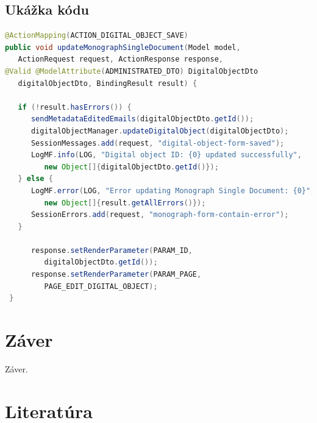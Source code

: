 \documentclass[
  print, %
  table,   %
  lof,     %
  nolot,     %
]{fithesis3}
\begin{document}
\section{Ukážka kódu}
\begin{lstlisting}[language=Java, basicstyle=\small, style=java-nice]
@ActionMapping(ACTION_DIGITAL_OBJECT_SAVE)
public void updateMonographSingleDocument(Model model, 
   ActionRequest request, ActionResponse response,
@Valid @ModelAttribute(ADMINISTRATED_DTO) DigitalObjectDto 
   digitalObjectDto, BindingResult result) {

   if (!result.hasErrors()) {
      sendMetadataEditedEmails(digitalObjectDto.getId());
      digitalObjectManager.updateDigitalObject(digitalObjectDto);
      SessionMessages.add(request, "digital-object-form-saved");
      LogMF.info(LOG, "Digital object ID: {0} updated successfully", 
         new Object[]{digitalObjectDto.getId()});
   } else {
      LogMF.error(LOG, "Error updating Monograph Single Document: {0}",
         new Object[]{result.getAllErrors()});
      SessionErrors.add(request, "monograph-form-contain-error");
   }
    
      response.setRenderParameter(PARAM_ID, 
         digitalObjectDto.getId());
      response.setRenderParameter(PARAM_PAGE, 
         PAGE_EDIT_DIGITAL_OBJECT);
 }
\end{lstlisting}


\chapter{Záver}
Záver.
\chapter*{Literatúra}
\printbibliography[heading=none] %
\end{document}
